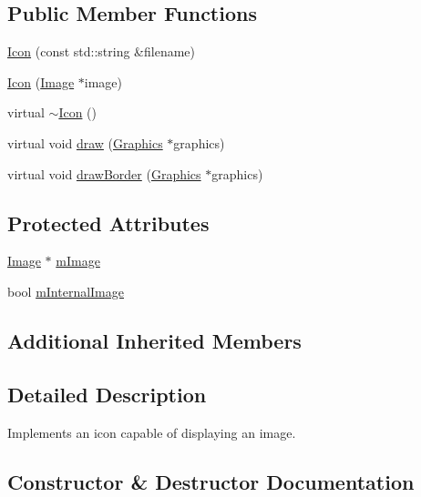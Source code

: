 \subsection*{Public Member Functions}
\begin{DoxyCompactItemize}
\item 
\hyperlink{classgcn_1_1Icon_ade352edc3f6c185035db9c642006fbd3}{Icon} (const std\+::string \&filename)
\item 
\hyperlink{classgcn_1_1Icon_a4dcc025bfd07f33f829f020dcc3298f0}{Icon} (\hyperlink{classgcn_1_1Image}{Image} $\ast$image)
\item 
virtual \hyperlink{classgcn_1_1Icon_a3d626c3c0768ed5d6ba8631aee79ea58}{$\sim$\+Icon} ()
\item 
virtual void \hyperlink{classgcn_1_1Icon_ac490339b9e1824a291a5da93581215d1}{draw} (\hyperlink{classgcn_1_1Graphics}{Graphics} $\ast$graphics)
\item 
virtual void \hyperlink{classgcn_1_1Icon_a1533b6c01b209ff077b9fc37af364db7}{draw\+Border} (\hyperlink{classgcn_1_1Graphics}{Graphics} $\ast$graphics)
\end{DoxyCompactItemize}
\subsection*{Protected Attributes}
\begin{DoxyCompactItemize}
\item 
\hyperlink{classgcn_1_1Image}{Image} $\ast$ \hyperlink{classgcn_1_1Icon_afeed96d96fc1f8cbe51fff7a1933dcc7}{m\+Image}
\item 
bool \hyperlink{classgcn_1_1Icon_add136055bf50bf4cf6da058903d89239}{m\+Internal\+Image}
\end{DoxyCompactItemize}
\subsection*{Additional Inherited Members}


\subsection{Detailed Description}
Implements an icon capable of displaying an image. 

\subsection{Constructor \& Destructor Documentation}
